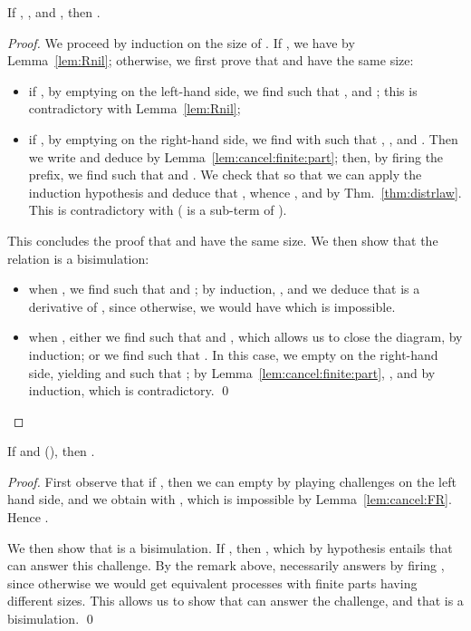 \documentclass{llncs}
\begin{document}
\begin{lem}\label{lem:cancel:FR}
  If , , and , then .
\end{lem}
\begin{proof}
  We proceed by induction on the size of . If , we have
   by Lemma~\ref{lem:Rnil}; otherwise, we first prove that 
  and  have the same size:
  \begin{itemize}
  \item if , by emptying  on the left-hand side,
    we find  such that ,  and ; this is contradictory with
    Lemma~\ref{lem:Rnil};
  \item if , by emptying  on the right-hand
    side, we find  with  such that
    , ,  and
    . Then we write  and deduce
     by Lemma~\ref{lem:cancel:finite:part}; then,
    by firing the  prefix, we find  such that
     and . We check that  so that we can apply the induction hypothesis and
    deduce that , whence ,
    and  by Thm.~\ref{thm:distrlaw}. This
    is contradictory with  ( is a sub-term of
    ). 
  \end{itemize}
  This concludes the proof that  and  have the same size. We
  then show that the relation  is a bisimulation:
  \begin{itemize}
  \item when , we find  such that  and ; by induction, , and we
    deduce that  is a derivative of , since otherwise, we would
    have  which is impossible.
  \item when , either we find  such that
     and , which allows us to close the
    diagram, by induction; or we find  such that . In this case, we empty  on the right-hand side,
    yielding  and  such that ; by
    Lemma~\ref{lem:cancel:finite:part}, , and 
    by induction, which is contradictory. \qed
  \end{itemize}
\end{proof}



\begin{lem}\label{lem:FF}
  If  and  (), then .
\end{lem}
\begin{proof}
  First observe that if , then we can empty
   by playing challenges on the left hand side, and we obtain
   with , which is impossible by
  Lemma~\ref{lem:cancel:FR}. Hence .
  
  We then show that  is a
  bisimulation. If , then ,
  which by hypothesis entails that  can answer this challenge.
  By the remark above,  necessarily answers by firing ,
  since otherwise we would get equivalent processes with finite parts
  having different sizes. This allows us to show that  can
  answer the challenge, and that \R{} is a bisimulation.
  \qed
\end{proof}
\end{document}
